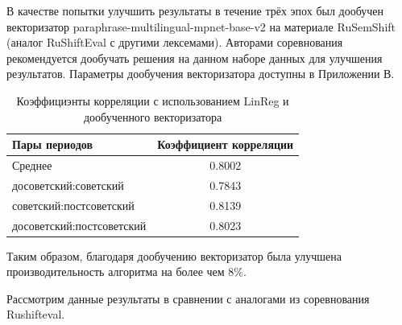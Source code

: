 \documentclass[LI,VKR]{HSEUniversity}
\begin{document}
В качестве попытки улучшить результаты в течение трёх эпох
был дообучен векторизатор paraphrase-multilingual-mpnet-base-v2
на материале RuSemShift (аналог RuShiftEval с другими лексемами).
Авторами соревнования рекомендуется дообучать решения на данном наборе данных для улучшения результатов.
Параметры дообучения векторизатора доступны в Приложении В.

\begin{table}[H]
\centering
\caption{Коэффициэнты корреляции с использованием LinReg и дообученного векторизатора}
\begin{tabular}{|l|c|}
\hline
\textbf{Пары периодов}                  & \textbf{Коэффициент корреляции} \\
\hline
Среднее            & 0.8002                  \\
\hline
досоветский:советский           & 0.7843                  \\
\hline
советский:постсоветский          & 0.8139                  \\
\hline
досоветский:постсоветский      & 0.8023                  \\
\hline
\end{tabular}
\end{table}

Таким образом, благодаря дообучению векторизатор была улучшена производительность алгоритма
на более чем 8\%.

Рассмотрим данные результаты в сравнении с аналогами из соревнования Rushifteval.
\end{document}
